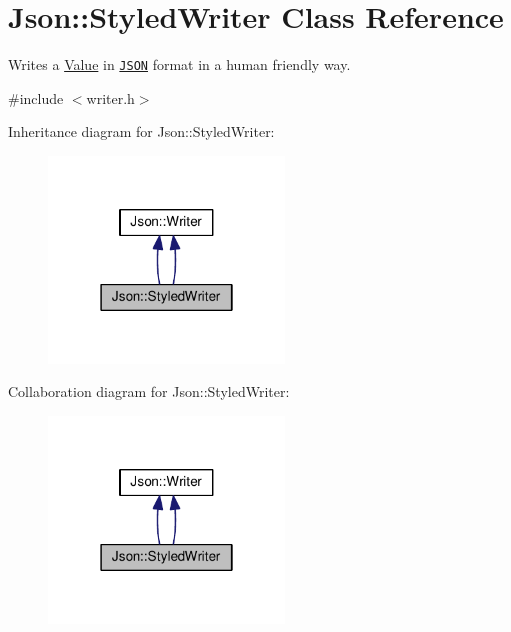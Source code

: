 \hypertarget{classJson_1_1StyledWriter}{\section{Json\-:\-:Styled\-Writer Class Reference}
\label{d8/d76/classJson_1_1StyledWriter}
}


Writes a \hyperlink{classJson_1_1Value}{Value} in \href{http://www.json.org}{\tt J\-S\-O\-N} format in a human friendly way.  




{\ttfamily \#include $<$writer.\-h$>$}



Inheritance diagram for Json\-:\-:Styled\-Writer\-:
\nopagebreak
\begin{figure}[H]
\begin{center}
\leavevmode
\includegraphics[width=178pt]{df/d9d/classJson_1_1StyledWriter__inherit__graph}
\end{center}
\end{figure}


Collaboration diagram for Json\-:\-:Styled\-Writer\-:
\nopagebreak
\begin{figure}[H]
\begin{center}
\leavevmode
\includegraphics[width=178pt]{d7/df3/classJson_1_1StyledWriter__coll__graph}
\end{center}
\end{figure}
